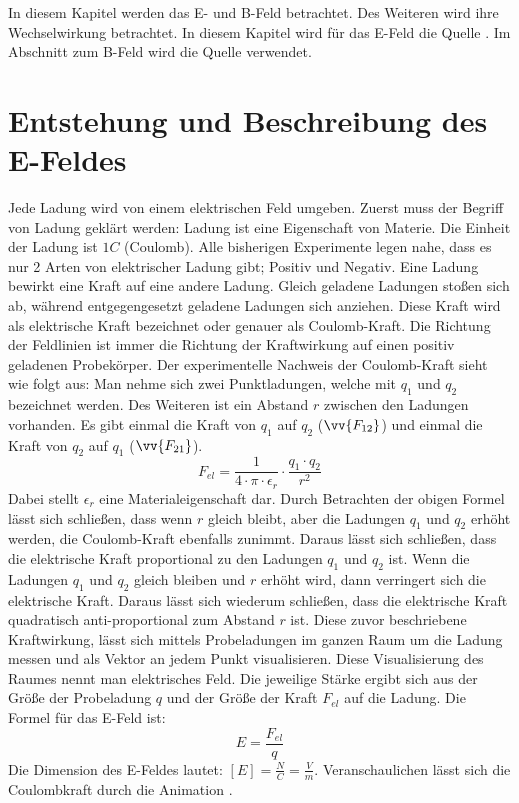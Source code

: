 In diesem Kapitel werden das E- und B-Feld betrachtet.
Des Weiteren wird ihre Wechselwirkung betrachtet.
In diesem Kapitel wird für das E-Feld die Quelle \cite{Animation}.
Im Abschnitt zum B-Feld wird die Quelle \cite{Lorentzkraft}verwendet.
\section{Entstehung und Beschreibung des E-Feldes}
Jede Ladung wird von einem elektrischen Feld umgeben.
Zuerst muss der Begriff von Ladung geklärt werden:
Ladung ist eine Eigenschaft von Materie.
Die Einheit der Ladung ist $1C$ (Coulomb).
Alle bisherigen Experimente legen nahe, dass es nur 2 Arten von elektrischer Ladung gibt; Positiv und Negativ.
Eine Ladung bewirkt eine Kraft auf eine andere Ladung.
Gleich geladene Ladungen stoßen sich ab, während entgegengesetzt geladene Ladungen sich anziehen.
Diese Kraft wird als elektrische Kraft bezeichnet oder genauer als Coulomb-Kraft.
Die Richtung der Feldlinien ist immer die Richtung der Kraftwirkung auf einen positiv geladenen Probekörper.
Der experimentelle Nachweis der Coulomb-Kraft sieht wie folgt aus:
Man nehme sich zwei Punktladungen, welche mit $q_1$ und $q_2$ bezeichnet werden. 
Des Weiteren ist ein Abstand $r$ zwischen den Ladungen vorhanden.
Es gibt einmal die Kraft von $q_1$ auf $q_2$ ($\vv{F_{12}}$) und einmal die Kraft von $q_2$ auf $q_1$ ($\vv{F_{21}}$).
\begin{equation*}
   F_{el} = \frac{1}{4 \cdot \pi \cdot \epsilon_r} \cdot \frac{q_1 \cdot q_2}{r^2}    
\end{equation*}
Dabei stellt $\epsilon_r$ eine Materialeigenschaft dar.
Durch Betrachten der obigen Formel lässt sich schließen, dass wenn $r$ gleich bleibt, aber die Ladungen $q_1$ und $q_2$ erhöht werden, die Coulomb-Kraft ebenfalls zunimmt.
Daraus lässt sich schließen, dass die elektrische Kraft proportional zu den Ladungen $q_1$ und $q_2$ ist. 
Wenn die Ladungen $q_1$ und $q_2$ gleich bleiben und $r$ erhöht wird, dann verringert sich die elektrische Kraft.
Daraus lässt sich wiederum schließen, dass die elektrische Kraft quadratisch anti-proportional zum Abstand $r$ ist.
Diese zuvor beschriebene Kraftwirkung, lässt sich mittels Probeladungen im ganzen Raum um die Ladung messen und als Vektor an jedem Punkt visualisieren.
Diese Visualisierung des Raumes nennt man elektrisches Feld.
Die jeweilige Stärke ergibt sich aus der Größe der Probeladung $q$ und der Größe der Kraft $F_{el}$ auf die Ladung.
Die Formel für das E-Feld ist:
\begin{equation*}
    E = \frac{F_{el}}{q}
\end{equation*}
Die Dimension des E-Feldes lautet: $[E] = \frac{N}{C} = \frac{V}{m}$.
Veranschaulichen lässt sich die Coulombkraft durch die Animation \cite{Animation}.

